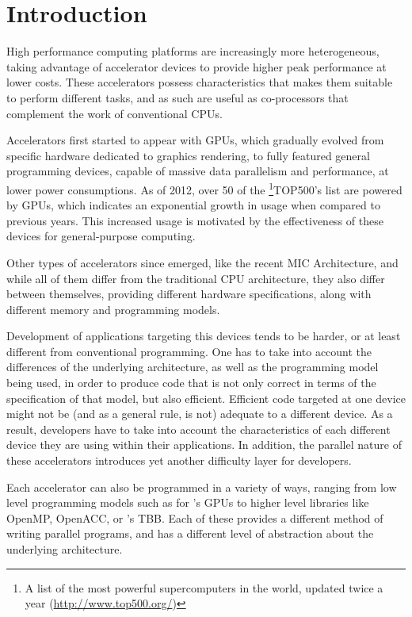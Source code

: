 \documentclass[main.tex]{subfiles}
\begin{document}
\chapter{Introduction}


High performance computing platforms are increasingly more heterogeneous, taking advantage of accelerator devices to provide higher peak performance at lower costs. These accelerators possess characteristics that makes them suitable to perform different tasks, and as such are useful as co-processors that complement the work of conventional \acp{CPU}.

Accelerators first started to appear with \acp{GPU}, which gradually evolved from specific hardware dedicated to graphics rendering, to fully featured general programming devices, capable of massive data parallelism and performance, at lower power consumptions. As of 2012, over 50 of the \footnote{A list of the most powerful supercomputers in the world, updated twice a year (\url{http://www.top500.org/})}{TOP500's} list are powered by \acp{GPU}, which indicates an exponential growth in usage when compared to previous years. This increased usage is motivated by the effectiveness of these devices for general-purpose computing. 

Other types of accelerators since emerged, like the recent \intel \ac{MIC} Architecture, and while all of them differ from the traditional \ac{CPU} architecture, they also differ between themselves, providing different hardware specifications, along with different memory and programming models. 

Development of applications targeting this devices tends to be harder, or at least different from conventional programming. One has to take into account the differences of the underlying architecture, as well as the programming model being used, in order to produce code that is not only correct in terms of the specification of that model, but also efficient. Efficient code targeted at one device might not be (and as a general rule, is not) adequate to a different device. As a result, developers have to take into account the characteristics of each different device they are using within their applications. In addition, the parallel nature of these accelerators introduces yet another difficulty layer for developers.

Each accelerator can also be programmed in a variety of ways, ranging from low level programming models such as \cuda for \nvidia's \acp{GPU} to higher level libraries like \acs{OpenMP}, \acs{OpenACC}, or \intel's \acs{TBB}. Each of these provides a different method of writing parallel programs, and has a different level of abstraction about the underlying architecture. 
\end{document}
